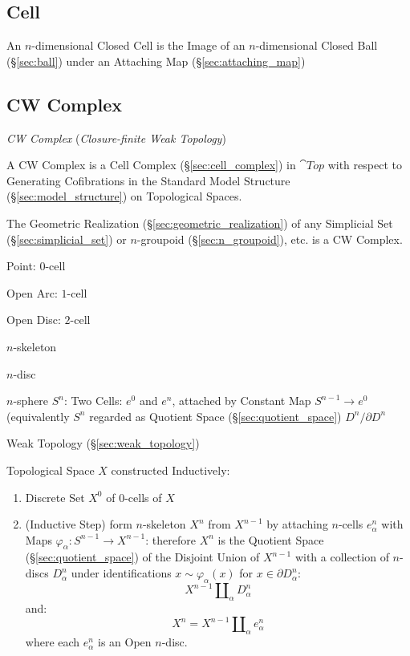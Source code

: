 \subsection{Cell}\label{sec:topology_cell}

An $n$-dimensional Closed Cell is the Image of an $n$-dimensional
Closed Ball (\S\ref{sec:ball}) under an Attaching Map
(\S\ref{sec:attaching_map})



\subsection{CW Complex}\label{sec:cw_complex}

\emph{CW Complex} (\emph{Closure-finite Weak Topology})

A CW Complex is a Cell Complex (\S\ref{sec:cell_complex}) in
$\cat{Top}$ with respect to Generating Cofibrations in the Standard
Model Structure (\S\ref{sec:model_structure}) on Topological Spaces.

The Geometric Realization (\S\ref{sec:geometric_realization}) of any
Simplicial Set (\S\ref{sec:simplicial_set}) or $n$-groupoid
(\S\ref{sec:n_groupoid}), etc. is a CW Complex.

Point: $0$-cell

Open Arc: $1$-cell

Open Disc: $2$-cell

$n$-skeleton

$n$-disc

$n$-sphere $S^n$: Two Cells: $e^0$ and $e^n$, attached by Constant Map
$S^{n-1} \rightarrow e^0$ (equivalently $S^n$ regarded as Quotient
Space (\S\ref{sec:quotient_space}) $D^n/ \partial D^n$

Weak Topology (\S\ref{sec:weak_topology})

Topological Space $X$ constructed Inductively: \cite{hatcher02}
\begin{enumerate}
  \item Discrete Set $X^0$ of $0$-cells of $X$
  \item (Inductive Step) form $n$-skeleton $X^n$ from $X^{n-1}$ by
    attaching $n$-cells $e^n_\alpha$ with Maps $\varphi_\alpha :
    S^{n-1} \rightarrow X^{n-1}$: therefore $X^n$ is the Quotient
    Space (\S\ref{sec:quotient_space}) of the Disjoint Union of
    $X^{n-1}$ with a collection of $n$-discs $D^n_\alpha$ under
    identifications $x \sim \varphi_\alpha(x)$ for $x \in \partial
    D^n_\alpha$:
    \[
      X^{n-1}\amalg_\alpha D^n_\alpha
    \]
    and:
    \[
      X^n = X^{n-1}\amalg_\alpha e^n_\alpha
    \]
    where each $e^n_\alpha$ is an Open $n$-disc.
\end{enumerate}


